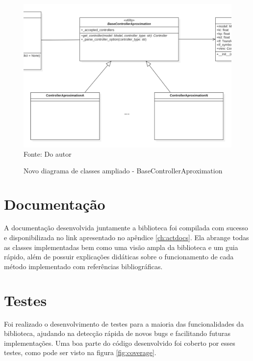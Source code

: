 \begin{figure}[H]
    \centering
    \caption{Novo diagrama de classes ampliado - BaseControllerAproximation}
    \includegraphics[scale=0.40]{figuras/class_diag_bcacontroller_new}
    \label{fig:class_diag_bcacontroller_new}
    \\
    \vspace{0cm}\hspace{0cm}\small{Fonte: Do autor}
\end{figure}


\section{Documentação}

A documentação desenvolvida juntamente a biblioteca foi compilada com sucesso e disponibilizada no link apresentado
no apêndice \ref{ch:actdocs}.
Ela abrange todas as classes implementadas bem como uma visão ampla da biblioteca e um guia rápido, além de possuir
explicações didáticas sobre o funcionamento de cada método implementado com referências bibliográficas.


\section{Testes}

Foi realizado o desenvolvimento de testes para a maioria das funcionalidades da biblioteca, ajudando na detecção
rápida de novos bugs e facilitando futuras implementações.
Uma boa parte do código desenvolvido foi coberto por esses testes, como pode ser visto na figura \ref{fig:coverage}.

